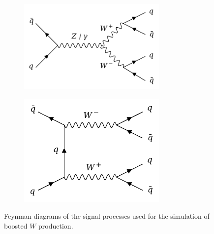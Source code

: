 \documentclass[main]{subfiles} %
\begin{document}
\begin{figure}[H]
     \centering
     \begin{subfigure}[h]{0.49\textwidth}
         \centering
         \includegraphics[width=0.8\textwidth]{../Figures/Datasets/pp_WW/qq_aZ_WW_qq.png}
          \caption{}
         \label{fig:feynman_WW_qqanihilation1}
     \end{subfigure}
     \begin{subfigure}[h]{0.49\textwidth}
         \centering
         \includegraphics[width=0.8\textwidth]{../Figures/Datasets/pp_WW/qq_WW_qq.png}
          \caption{}
         \label{fig:feynman_WW_qqanihilation2}
     \end{subfigure}
     \caption{Feynman diagrams of the signal processes used for the simulation of boosted $W$ production.}
        \label{fig:feynman_WW}
\end{figure} 

\vspace{11pt}

\vspace{20pt}
\end{document}
